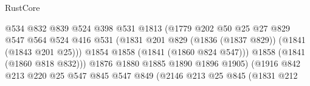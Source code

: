 \begin{lexlean}{RustCore}
\begin{coremodule}
                                              @534
                                              @832
                                              @839
                                              @524
                                              @398
                                              @531
                                              @1813
                                              (@1779
                                                @202
                                                @50
                                                @25
                                                @27
                                                @829
                                                @547
                                                @564
                                                @524
                                                @416
                                                @531
                                                (@1831
                                                  @201
                                                  @829
                                                  (@1836 (@1837 @829))
                                                  (@1841 (@1843 @201 @25)))
                                                @1854
                                                @1858
                                                (@1841 (@1860 @824 @547)))
                                              @1858
                                              (@1841 (@1860 @818 @832)))
                                            @1876
                                            @1880
                                            @1885
                                            @1890
                                            @1896
                                            @1905)
                                          (@1916
                                            @842
                                            @213
                                            @220
                                            @25
                                            @547
                                            @845
                                            @547
                                            @849
                                            (@2146
                                              @213
                                              @25
                                              @845
                                              (@1831
                                                @212

\end{coremodule}
\end{lexlean}
